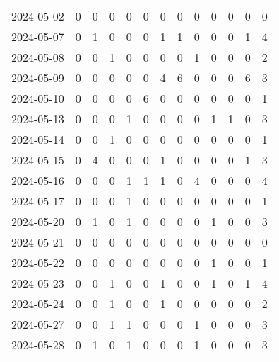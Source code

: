 \documentclass[dvipdfmx,oneside]{article}
\begin{document}
\begin{longtable}{lcccccccccccc}
        2024-05-02 &     0 &     0 &     0 &     0 &     0 &     0 &     0 &     0 &     0 &     0 &     0 &      0 \\
        2024-05-07 &     0 &     1 &     0 &     0 &     0 &     1 &     1 &     0 &     0 &     0 &     1 &      4 \\
        2024-05-08 &     0 &     0 &     1 &     0 &     0 &     0 &     0 &     1 &     0 &     0 &     0 &      2 \\
        2024-05-09 &     0 &     0 &     0 &     0 &     0 &     4 &     6 &     0 &     0 &     0 &     6 &      3 \\
        2024-05-10 &     0 &     0 &     0 &     0 &     6 &     0 &     0 &     0 &     0 &     0 &     0 &      1 \\
        2024-05-13 &     0 &     0 &     0 &     1 &     0 &     0 &     0 &     0 &     1 &     1 &     0 &      3 \\
        2024-05-14 &     0 &     0 &     1 &     0 &     0 &     0 &     0 &     0 &     0 &     0 &     0 &      1 \\
        2024-05-15 &     0 &     4 &     0 &     0 &     0 &     1 &     0 &     0 &     0 &     0 &     1 &      3 \\
        2024-05-16 &     0 &     0 &     0 &     1 &     1 &     1 &     0 &     4 &     0 &     0 &     0 &      4 \\
        2024-05-17 &     0 &     0 &     0 &     1 &     0 &     0 &     0 &     0 &     0 &     0 &     0 &      1 \\
        2024-05-20 &     0 &     1 &     0 &     1 &     0 &     0 &     0 &     0 &     1 &     0 &     0 &      3 \\
        2024-05-21 &     0 &     0 &     0 &     0 &     0 &     0 &     0 &     0 &     0 &     0 &     0 &      0 \\
        2024-05-22 &     0 &     0 &     0 &     0 &     0 &     0 &     0 &     0 &     1 &     0 &     0 &      1 \\
        2024-05-23 &     0 &     0 &     1 &     0 &     0 &     1 &     0 &     0 &     1 &     0 &     1 &      4 \\
        2024-05-24 &     0 &     0 &     1 &     0 &     0 &     1 &     0 &     0 &     0 &     0 &     0 &      2 \\
        2024-05-27 &     0 &     0 &     1 &     1 &     0 &     0 &     0 &     1 &     0 &     0 &     0 &      3 \\
        2024-05-28 &     0 &     1 &     0 &     1 &     0 &     0 &     0 &     1 &     0 &     0 &     0 &      3 \\

\end{longtable}
\end{document}
